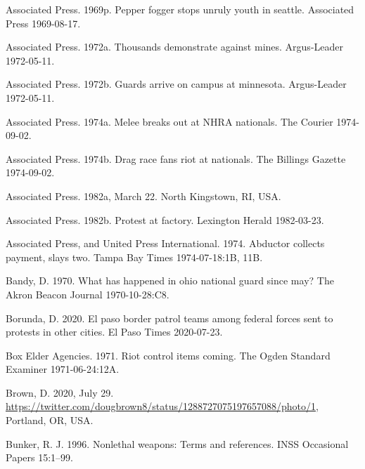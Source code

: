 \documentclass[
  11pt,
]{krantz}
\newlength{\cslhangindent}
\newlength{\cslentryspacingunit} %
\newenvironment{CSLReferences}[2] %
 {%
  \setlength{\parindent}{0pt}
  \ifodd #1
  \let\oldpar\par
  \def\par{\hangindent=\cslhangindent\oldpar}
  \fi
  \setlength{\parskip}{#2\cslentryspacingunit}
 }%
 {}
\begin{document}
\begin{CSLReferences}{1}{0}
\leavevmode{}%
Associated Press. 1969p. Pepper fogger stops unruly youth in seattle. Associated Press 1969-08-17.

\leavevmode{}%
Associated Press. 1972a. Thousands demonstrate against mines. Argus-Leader 1972-05-11.

\leavevmode{}%
Associated Press. 1972b. Guards arrive on campus at minnesota. Argus-Leader 1972-05-11.

\leavevmode{}%
Associated Press. 1974a. Melee breaks out at NHRA nationals. The Courier 1974-09-02.

\leavevmode{}%
Associated Press. 1974b. Drag race fans riot at nationals. The Billings Gazette 1974-09-02.

\leavevmode{}%
Associated Press. 1982a, March 22. North Kingstown, RI, USA.

\leavevmode{}%
Associated Press. 1982b. Protest at factory. Lexington Herald 1982-03-23.

\leavevmode{}%
Associated Press, and United Press International. 1974. Abductor collects payment, slays two. Tampa Bay Times 1974-07-18:1B, 11B.

\leavevmode{}%
Bandy, D. 1970. What has happened in ohio national guard since may? The Akron Beacon Journal 1970-10-28:C8.

\leavevmode{}%
Borunda, D. 2020. El paso border patrol teams among federal forces sent to protests in other cities. El Paso Times 2020-07-23.

\leavevmode{}%
Box Elder Agencies. 1971. Riot control items coming. The Ogden Standard Examiner 1971-06-24:12A.

\leavevmode{}%
Brown, D. 2020, July 29. \url{https://twitter.com/dougbrown8/status/1288727075197657088/photo/1}, Portland, OR, USA.

\leavevmode{}%
Bunker, R. J. 1996. Nonlethal weapons: Terms and references. INSS Occasional Papers 15:1--99.


\end{CSLReferences}
\end{document}
